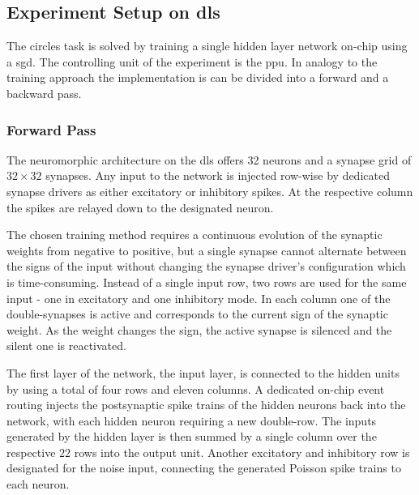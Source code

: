 


\subsection{Experiment Setup on \gls{dls}}
The circles task is solved by training a single hidden layer network on-chip using a \acrlong{sgd}. The controlling unit of the experiment is the \gls{ppu}. In analogy to the training approach the implementation is can be divided into a forward and a backward pass. %

\subsubsection*{Forward Pass}

The neuromorphic architecture on the \gls{dls} offers 32 neurons and a synapse grid of $32 \times 32$ synapses. Any input to the network is injected row-wise by dedicated synapse drivers as either excitatory or inhibitory spikes. At the respective column the spikes are relayed down to the designated neuron. 

The chosen training method requires a continuous evolution of the synaptic weights from negative to positive, but a single synapse cannot alternate between the signs of the input without changing the synapse driver's configuration which is time-consuming. Instead of a single input row, two rows are used for the same input - one in excitatory and one inhibitory mode. In each column one of the double-synapses is active and corresponds to the current sign of the synaptic weight. As the weight changes the sign, the active synapse is silenced and the silent one is reactivated. 

The first layer of the network, the input layer, is connected to the hidden units by using a total of four rows and eleven columns. A dedicated on-chip event routing injects the postsynaptic spike trains of the hidden neurons back into the network, with each hidden neuron requiring a new double-row. The inputs generated by the hidden layer is then summed by a single column over the respective $22$ rows into the output unit. Another excitatory and inhibitory row is designated for the noise input, connecting the generated Poisson spike trains to each neuron.

